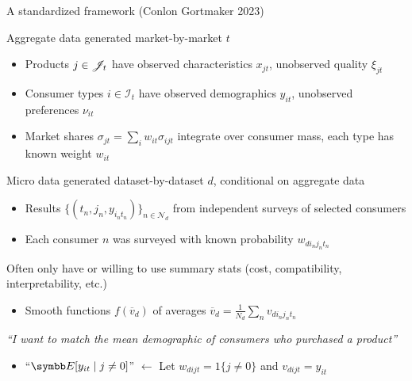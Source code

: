 \documentclass[aspectratio=169,10pt]{beamer}
\begin{document}
\begin{frame}[label=framework]{A standardized framework (Conlon Gortmaker 2023)}
    \begin{wideitemize}
        
        \item Aggregate data generated market-by-market $t$
        \begin{itemize}
            \item \alert{Products} $j \in \mathscr{J}_t$ have observed characteristics $x_{jt}$, unobserved quality $\xi_{jt}$
            \item \alert{Consumer types} $i \in \mathcal{I}_t$ have observed demographics $y_{it}$, unobserved preferences $\nu_{it}$
            \item \alert{Market shares} $\sigma_{jt} = \sum_i w_{it} \sigma_{ijt}$ integrate over consumer mass, each type has known weight $w_{it}$
        \end{itemize}
        
        \item Micro data generated dataset-by-dataset $d$, conditional on aggregate data
        \begin{itemize}
            \item Results $\{(t_n, j_n, y_{i_nt_n})\}_{n \in \mathcal{N}_d}$ from \alert{independent surveys} of \alert{selected consumers}
            \item Each consumer $n$ was surveyed with known probability $w_{di_nj_nt_n}$
        \end{itemize}
        
        \item Often only have or willing to use \alert{summary stats} (cost, compatibility, interpretability, etc.)
        \begin{itemize}
            \item Smooth functions $f(\overline{v}_d)$ of averages $\overline{v}_d = \frac{1}{N_d} \sum_n v_{di_nj_nt_n}$
        \end{itemize}
        
        \item \textit{``I want to match the mean demographic of consumers who purchased a product''}
        \begin{itemize}
            \item ``$\E[y_{it} \mid j \neq 0]$'' $\leftarrow$ Let $w_{dijt} = 1\{j \neq 0\}$ and $v_{dijt} = y_{it}$
        \end{itemize}
    \end{wideitemize}
\end{frame}
\end{document}
